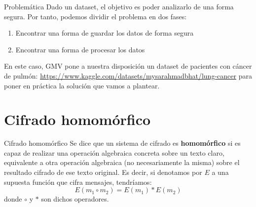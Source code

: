 \documentclass{beamer}
\begin{document}
\begin{frame}{Problemática}
    \justifying
    Dado un dataset, el objetivo es poder analizarlo de una forma segura. Por tanto, podemos dividir el problema en dos fases: 
    \begin{enumerate}
        \item Encontrar una forma de guardar los datos de forma segura 
        \item Encontrar una forma de procesar los datos
    \end{enumerate} 

    En este caso, GMV pone a nuestra disposición un dataset de pacientes con cáncer de pulmón: 
    \url{https://www.kaggle.com/datasets/mysarahmadbhat/lung-cancer} para poner en práctica la solución que vamos a plantear. 
\end{frame}

\section{Cifrado homomórfico}
\begin{frame}{Cifrado homomórfico}
    \justifying
	Se dice que un sistema de cifrado es \textbf{homomórfico} si es capaz de realizar una operación algebraica concreta sobre un texto claro, equivalente a otra operación algebraica (no necesariamente la misma) sobre el resultado cifrado de ese texto original. Es decir, si denotamos por $E$ a una supuesta función que cifra mensajes, tendríamos: 
   $$ E(m_1  \circ  m_2) = E(m_1)  \ast  E(m_2) $$
	donde $\circ$ y $\ast$ son dichos operadores.
\end{frame}




\end{document}
